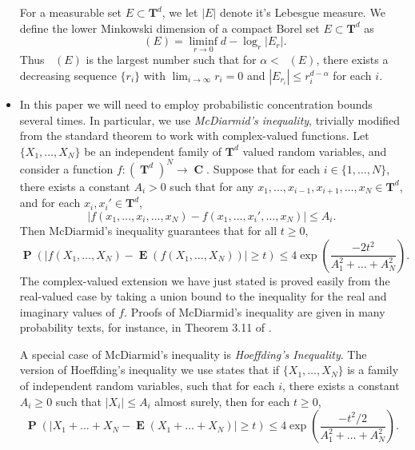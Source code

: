 \documentclass[12pt,reqno]{article}
\numberwithin{equation}{section}
\DeclareMathOperator{\hausdim}{\dim_{\mathbf{H}}}
\DeclareMathOperator{\lowminkdim}{\underline{\dim}_{\mathbf{M}}}
\DeclareMathOperator{\TT}{\mathbf{T}}
\DeclareMathOperator{\CC}{\mathbf{C}}
\numberwithin{theorem}{section}
\DeclareMathOperator{\EE}{\mathbf{E}}
\DeclareMathOperator{\PP}{\mathbf{P}}
\begin{document}
\begin{itemize}

    For a measurable set $E \subset \mathbf{T}^d$, we let $|E|$ denote it's Lebesgue measure. We define the lower Minkowski dimension of a compact Borel set $E \subset \mathbf{T}^d$ as
    \[ \lowminkdim(E) = \liminf_{r \to 0} d - \log_r|E_r|. \]
    Thus $\lowminkdim(E)$ is the largest number such that for $\alpha < \lowminkdim(E)$, there exists a decreasing sequence $\{ r_i \}$ with $\lim_{i \to \infty} r_i = 0$ and $|E_{r_i}| \leq r_i^{d - \alpha}$ for each $i$.

    \item In this paper we will need to employ probabilistic concentration bounds several times. In particular, we use \emph{McDiarmid's inequality}, trivially modified from the standard theorem to work with complex-valued functions. Let $\{ X_1, \dots, X_N \}$ be an independent family of $\mathbf{T}^d$ valued random variables, and consider a function $f: (\TT^d)^N \to \CC$. Suppose that for each $i \in \{ 1, \dots, N \}$, there exists a constant $A_i > 0$ such that for any $x_1, \dots, x_{i-1}, x_{i+1}, \dots, x_N \in \mathbf{T}^d$, and for each $x_i, x_i' \in \mathbf{T}^d$,
    \[ |f(x_1, \dots, x_i, \dots, x_N) - f(x_1, \dots, x_i', \dots, x_N)| \leq A_i. \]
    Then McDiarmid's inequality guarantees that for all $t \geq 0$,
    \[ \PP \left( |f(X_1, \dots, X_N) - \EE(f(X_1, \dots, X_N))| \geq t \right) \leq 4 \exp \left( \frac{-2t^2}{A_1^2 + \dots + A_N^2} \right). \]
    The complex-valued extension we have just stated is proved easily from the real-valued case by taking a union bound to the inequality for the real and imaginary values of $f$. Proofs of McDiarmid's inequality are given in many probability texts, for instance, in Theorem 3.11 of \cite{VanHandel}.

    A special case of McDiarmid's inequality is \emph{Hoeffding's Inequality}. The version of Hoeffding's inequality we use states that if $\{ X_1, \dots, X_N \}$ is a family of independent random variables, such that for each $i$, there exists a constant $A_i \geq 0$ such that $|X_i| \leq A_i$ almost surely, then for each $t \geq 0$,
    \[ \PP \left( |X_1 + \dots + X_N - \EE(X_1 + \dots + X_N)| \geq t \right) \leq 4 \exp \left(\frac{-t^2/2}{A_1^2 + \dots + A_N^2} \right). \]


\end{itemize}
\end{document}
